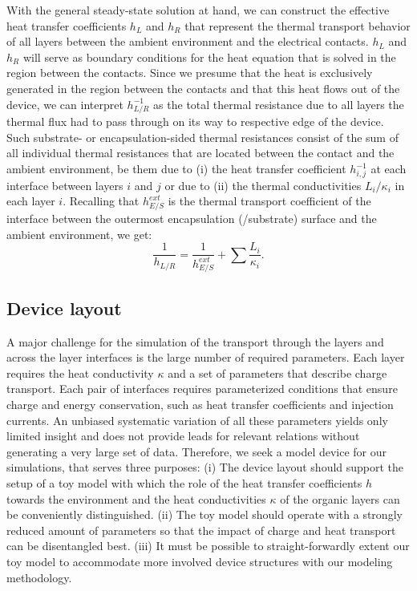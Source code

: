 \documentclass[%
9pt,
 aip,
rsi,%
 amsmath,amssymb,
preprint,%
]{revtex4-1}
\begin{document}
With the general steady-state solution at hand, we can construct the effective heat transfer coefficients $h_{L}$ and $h_{R}$ that represent the thermal transport behavior of all layers between the ambient environment and the electrical contacts. $h_{L}$ and $h_{R}$ will serve as boundary conditions for the heat equation that is solved in the region between the contacts.
Since we presume that the heat is exclusively generated in the region between the contacts and that this heat flows out of the device, we can interpret $h_{L/R}^{-1}$ as the total thermal resistance due to all layers the thermal flux had to pass through on its way to respective edge of the device.
Such substrate- or encapsulation-sided thermal resistances consist of the sum of all individual thermal resistances that are located between the contact and the ambient environment, be them due to (i) the heat transfer coefficient $h_{i,j}^{-1}$ at each interface between layers $i$ and $j$ or due to (ii) the thermal conductivities ${L_i}/{\kappa_i}$ in each layer $i$.  
Recalling that $h_{E/S}^{ext}$ is the thermal transport coefficient of the interface between the outermost encapsulation (/substrate) surface and the ambient environment, we get:
\begin{equation}
\frac{1}{h_{L/R}} = \frac{1}{h_{E/S}^{ext}} + \sum \frac{L_i}{\kappa_i}.
\label{eq:effectiveh}
\end{equation}

\subsection{Device layout}
A major challenge for the simulation of the transport through the layers and across the layer interfaces is the large number of required parameters.
Each layer requires the heat conductivity $\kappa$ and a set of parameters that describe charge transport. 
Each pair of interfaces requires parameterized conditions that ensure charge and energy conservation, such as heat transfer coefficients and injection currents. 
An unbiased systematic variation of all these parameters yields only limited insight and does not provide leads for relevant relations without generating a very large set of data.
Therefore, we seek a model device for our simulations, that serves three purposes: 
(i) The device layout should support the setup of a toy model with which the role of the heat transfer coefficients $h$ towards the environment and the heat conductivities $\kappa$ of the organic layers can be conveniently distinguished.
(ii) The toy model should operate with a strongly reduced amount of parameters so that the impact of charge and heat transport can be disentangled best.
(iii) It must be possible to straight-forwardly extent our toy model to accommodate more involved device structures with our modeling methodology.
\end{document}
